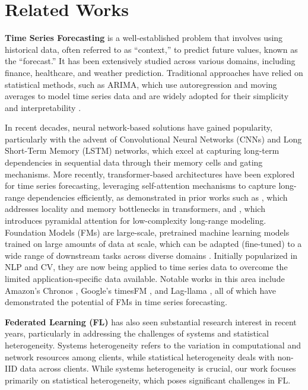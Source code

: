 \section{Related Works}
\textbf{Time Series Forecasting} is a well-established problem that involves using historical data, often referred to as ``context,'' to predict future values, known as the ``forecast.'' 
It has been extensively studied across various domains, including finance, healthcare, and weather prediction. 
Traditional approaches have relied on statistical methods, such as ARIMA, which use autoregression and moving averages to model time series data and are widely adopted for their simplicity and interpretability \cite{box2015time}.

In recent decades, neural network-based solutions have gained popularity, particularly with the advent of Convolutional Neural Networks (CNNs) \cite{cnn} and Long Short-Term Memory (LSTM) \cite{lstm} networks, which excel at capturing long-term dependencies in sequential data through their memory cells and gating mechanisms.
More recently, transformer-based architectures have been explored for time series forecasting, leveraging self-attention mechanisms to capture long-range dependencies efficiently, as demonstrated in prior works such as \cite{NEURIPS2019_6775a063}, which addresses locality and memory bottlenecks in transformers, and \cite{liu2022pyraformer}, which introduces pyramidal attention for low-complexity long-range modeling.
Foundation Models (FMs) are large-scale, pretrained machine learning models trained on large amounts of data at scale, which can be adapted (fine-tuned) to a wide range of downstream tasks across diverse domains \cite{bommasani2022opportunitiesrisksfoundationmodels}.
Initially popularized in NLP and CV, they are now being applied to time series data to overcome the limited application-specific data available. 
Notable works in this area include Amazon's Chronos \cite{chronos}, Google's timesFM \cite{timesFM}, and Lag-llama \cite{lagllama}, all of which have demonstrated the potential of FMs in time series forecasting.

\textbf{Federated Learning (FL)} has also seen substantial research interest in recent years, particularly in addressing the challenges of systems and statistical heterogeneity. 
Systems heterogeneity refers to the variation in computational and network resources among clients, while statistical heterogeneity deals with non-IID data across clients.
While systems heterogeneity is crucial, our work focuses primarily on statistical heterogeneity, which poses significant challenges in FL.

